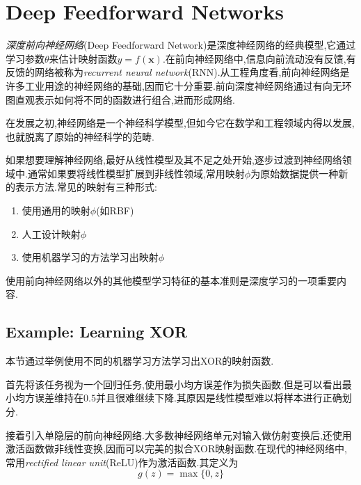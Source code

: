 \chapter{Deep Feedforward Networks}

\textit{深度前向神经网络}(Deep Feedforward Network)是深度神经网络的经典模型,它通过学习参数$\theta$来估计映射函数$y=f(\mathbf x)$.在前向神经网络中,信息向前流动没有反馈,有反馈的网络被称为\textit{recurrent neural network}(RNN).从工程角度看,前向神经网络是许多工业用途的神经网络的基础,因而它十分重要.前向深度神经网络通过有向无环图直观表示如何将不同的函数进行组合,进而形成网络.

在发展之初,神经网络是一个神经科学模型,但如今它在数学和工程领域内得以发展,也就脱离了原始的神经科学的范畴.

如果想要理解神经网络,最好从线性模型及其不足之处开始,逐步过渡到神经网络领域中.通常如果要将线性模型扩展到非线性领域,常用映射$\phi$为原始数据提供一种新的表示方法.常见的映射有三种形式:
\begin{enumerate}
\item 使用通用的映射$\phi$(如RBF)
\item 人工设计映射$\phi$
\item 使用机器学习的方法学习出映射$\phi$
\end{enumerate}

使用前向神经网络以外的其他模型学习特征的基本准则是深度学习的一项重要内容.

\section{Example: Learning XOR}

本节通过举例使用不同的机器学习方法学习出XOR的映射函数.

首先将该任务视为一个回归任务,使用最小均方误差作为损失函数.但是可以看出最小均方误差维持在$0.5$并且很难继续下降.其原因是线性模型难以将样本进行正确划分.

接着引入单隐层的前向神经网络.大多数神经网络单元对输入做仿射变换后,还使用激活函数做非线性变换,因而可以完美的拟合XOR映射函数.在现代的神经网络中,常用\textit{rectified linear unit}(ReLU)作为激活函数.其定义为
\begin{equation}
g(z)=\max\{0,z\}
\end{equation}